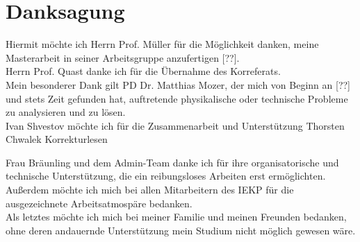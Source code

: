 \chapter*{Danksagung}
Hiermit m\"ochte ich Herrn Prof. M\"uller f\"ur die M\"oglichkeit danken, meine Masterarbeit in seiner Arbeitsgruppe anzufertigen [??].\\

Herrn Prof. Quast danke ich f\"ur die \"Ubernahme des Korreferats.\\

Mein besonderer Dank gilt PD Dr. Matthias Mozer, der mich von Beginn an [??] und stets Zeit gefunden hat, auftretende physikalische oder technische Probleme zu analysieren und zu l\"osen.\\

Ivan Shvestov m\"ochte ich f\"ur die Zusammenarbeit und Unterst\"utzung  
Thorsten Chwalek Korrekturlesen


Frau Br\"aunling und dem Admin-Team danke ich f\"ur ihre organisatorische und technische Unterst\"utzung, die ein reibungsloses Arbeiten erst erm\"oglichten.\\

Außerdem m\"ochte ich mich bei allen Mitarbeitern des IEKP f\"ur die ausgezeichnete Arbeitsatmosp\"are bedanken.\\

Als letztes m\"ochte ich mich bei meiner Familie und meinen Freunden bedanken, ohne deren andauernde Unterst\"utzung mein Studium nicht m\"oglich gewesen w\"are.
